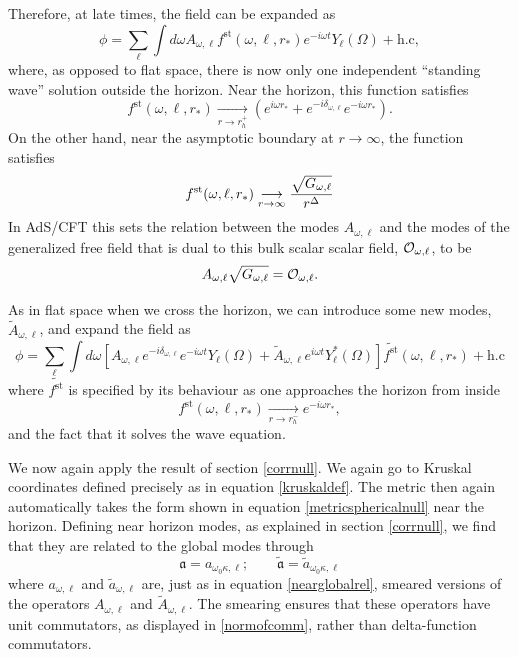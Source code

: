 \documentclass[12pt]{article}
\def\fst{f^{\text{st}}}
\newcommand{\op}{{\cal O}} %
\def\rtor{{r_*}}
\newcommand{\be}{\begin{equation}}
\newcommand{\ee}{\end{equation}}
\def \anh {\mathfrak{a}}
\def \tildanh {\widetilde{\mathfrak{a}}}
\begin{document}
Therefore, at late times, the field can be expanded as
\be
\label{phiexpandads}
\phi = \sum_{\ell} \int d \omega A_{\omega, \ell} \fst(\omega, \ell, \rtor) e^{-i \omega t} Y_{\ell}(\Omega) + \text{h.c},
\ee
where, as opposed to flat space, there is now only one independent ``standing wave'' solution outside the horizon. Near the horizon, this function satisfies
\be
\fst(\omega, \ell, \rtor)  \underset{r \rightarrow r_h^+}{\longrightarrow}  \left( e^{i \omega \rtor} + e^{-i \delta_{\omega,\ell}} e^{-i \omega \rtor} \right).
\ee
On the other hand, near the asymptotic boundary at $r \rightarrow \infty$, the function satisfies
\be
\fst(\omega, \ell, \rtor) \underset{r \rightarrow \infty}{\longrightarrow} {\sqrt{G_{\omega, \ell}} \over r^{\Delta}}
\ee
In AdS/CFT this sets the relation between the modes $A_{\omega, \ell}$ and the modes of the generalized free field that is dual to this bulk scalar scalar field, $\op_{\omega, \ell}$, to be
\be
\label{bulkbdryrelation}
A_{\omega, \ell} \sqrt{G_{\omega, \ell}} = \op_{\omega, \ell}.
\ee

As in flat space when we cross the horizon, we can introduce some new modes, $\widetilde{A}_{\omega, \ell}$, and expand the field as
\be
\label{adsexpandbehindhor}
\phi = \sum_{\ell} \int d \omega \left[A_{\omega, \ell}  e^{-i \delta_{\omega, \ell}} e^{-i \omega t} Y_{\ell}(\Omega)  + \widetilde{A}_{\omega, \ell}  e^{i \omega t} Y_{\ell}^*(\Omega) \right] \widetilde{\fst}(\omega, \ell, \rtor)  + \text{h.c}
\ee
where $\widetilde{\fst}$ is specified by its behaviour as one approaches the horizon from inside
\be
\fst(\omega, \ell, \rtor) \underset{r \rightarrow r_h^-}{\longrightarrow} e^{-i \omega \rtor},
\ee
and the fact that it solves the wave equation.

We now again apply the result of section \ref{corrnull}. We again go to Kruskal coordinates defined precisely as in equation \eqref{kruskaldef}. The metric then again automatically takes the form shown in equation \ref{metricsphericalnull} near the horizon. Defining near horizon modes, as explained in section \ref{corrnull}, we find that they are related to the global modes through
\be
\anh = a_{\omega_0 \kappa, \ell}; \qquad \tildanh = \widetilde{a}_{\omega_0 \kappa, \ell}
\ee
where $a_{\omega, \ell}$ and $\widetilde{a}_{\omega, \ell}$ are, just as in equation \eqref{nearglobalrel},  smeared versions of the operators $A_{\omega, \ell}$ and $\widetilde{A}_{\omega, \ell}$. The smearing ensures that these operators have unit commutators, as displayed in \eqref{normofcomm}, rather than delta-function commutators.
\end{document}
